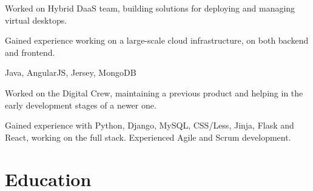 \documentclass[]{deedy-resume-openfont}
\begin{document}
\begin{minipage}[t]{0.63\textwidth}
\begin{tightemize}
\item Worked on Hybrid DaaS team, building solutions for deploying and managing virtual desktops.
\item Gained experience working on a large-scale cloud infrastructure, on both backend and frontend.
\item Java, AngularJS, Jersey, MongoDB
\end{tightemize}
\sectionsep

\begin{tightemize}
\item Worked on the Digital Crew, maintaining a previous product and helping in the early development stages of a newer one.
\item Gained experience with Python, Django, MySQL, CSS/Less, Jinja, Flask and React, working on the full stack. Experienced Agile and Scrum development.
\end{tightemize}
\sectionsep


\section{Education}
\sectionsep{}

\end{minipage} 
\end{document}
